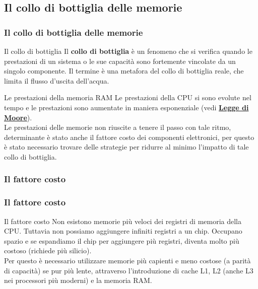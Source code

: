 \subsection[Il collo di bottiglia delle memorie]{Il collo di bottiglia delle memorie}
\begin{frame}
	\frametitle{Il collo di bottiglia delle memorie}
	 
	\begin{block}{Il collo di bottiglia}
		Il \textbf{collo di bottiglia} è un fenomeno che si verifica quando le prestazioni di un sistema o le sue capacità sono fortemente vincolate da un singolo componente. Il termine è una metafora del collo di bottiglia reale, che limita il flusso d'uscita dell'acqua.
	\end{block}
	\pause
	\begin{block}{Le prestazioni della memoria RAM}
		Le prestazioni della CPU si sono evolute nel tempo e le prestazioni sono aumentate in maniera esponenziale (vedi \hyperlink{subsub:moore_law}{\textbf{Legge di Moore}}).\\
		Le prestazioni delle memorie non riuscite a tenere il passo con tale ritmo, determinante è stato anche il fattore costo dei componenti elettronici, per questo è stato necessario trovare delle strategie per ridurre al minimo l'impatto di tale collo di bottiglia.
	\end{block}
	
\end{frame}


\subsubsection[Il fattore costo]{Il fattore costo}
\begin{frame}
	\frametitle{Il fattore costo}
	
	\begin{block}{Il fattore costo}
		Non esistono memorie più veloci dei registri di memoria della CPU.
		Tuttavia non possiamo aggiungere infiniti registri a un chip. Occupano spazio e se espandiamo il chip per aggiungere più registri, diventa molto più costoso (richiede più silicio).\\\vspace{1em}
		Per questo è necessario utilizzare memorie più capienti e meno costose (a parità di capacità) se pur più lente, attraverso l'introduzione di cache L1, L2 (anche L3 nei processori più moderni) e la memoria RAM.
	\end{block}
	
	
\end{frame}


